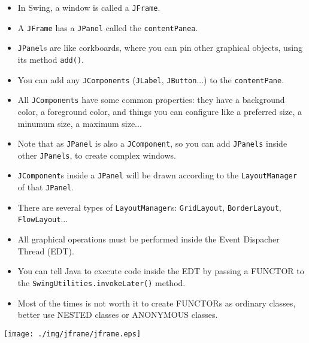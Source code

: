 \documentclass[a4paper, 9pt]{extarticle}
\begin{document}
\begin{itemize}

  \item In Swing, a window is called a \texttt{JFrame}.

  \item A \texttt{JFrame} has a \texttt{JPanel} called the \texttt{contentPanea}.

  \item \texttt{JPanel}s are like corkboards, where you can pin other graphical objects, using its method \texttt{add()}.

  \item You can add any \texttt{JComponents} (\texttt{JLabel}, \texttt{JButton}...) to the \texttt{contentPane}.

  \item All \texttt{JComponents} have some common properties: they have a background
    color, a foreground color, and things you can configure like a preferred
    size, a minumum size, a maximum size...

  \item Note that as \texttt{JPanel} is also a \texttt{JComponent}, so you can add \texttt{JPanels} inside other \texttt{JPanels}, to create complex windows.

  \item \texttt{JComponent}s inside a \texttt{JPanel} will be drawn according to the \texttt{LayoutManager} of that \texttt{JPanel}.

  \item There are several types of \texttt{LayoutManager}s: \texttt{GridLayout}, \texttt{BorderLayout}, \texttt{FlowLayout}...

  \item All graphical operations must be performed inside the Event Dispacher Thread (EDT).

  \item You can tell Java to execute code inside the EDT by passing a FUNCTOR to the \texttt{SwingUtilities.invokeLater()} method.

  \item Most of the times is not worth it to create FUNCTORs as ordinary classes, better use NESTED classes or ANONYMOUS classes.

\end{itemize}

\vspace{1cm}
\begin{center}
\texttt{[image: ./img/jframe/jframe.eps]}
\end{center}
\end{document}
